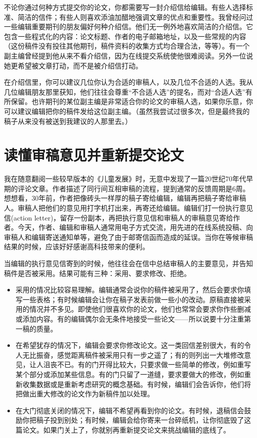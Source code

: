 不论你通过何种方式提交你的论文，你都需要写一封介绍信给编辑。有些人选择标准、简洁的信件；有些人则喜欢添油加醋地强调文章的优点和重要性。我曾经问过一些编辑重要期刊的朋友偏好何种介绍信。他们无一例外地喜欢简洁的介绍信。它包含一些程式化的内容：论文标题、作者的电子邮箱地址，以及一些常规的内容（这份稿件没有投往其他期刊，稿件资料的收集方式均合理合法，等等）。有一个副主编曾经提到他从来不看介绍信，因为在线提交系统使他很难阅读。另外一位说她更希望被文章打动，而不是被介绍信打动。

在介绍信里，你可以建议几位你认为合适的审稿人，以及几位不合适的人选。我从几位编辑朋友那里获知，他们往往会尊重“不合适人选”的提名，而对“合适人选”有所保留。也许期刊的某位副主编是非常适合你的论文的审稿人选，如果你乐意，你可以建议编辑把你的稿件发给这位副主编。（虽然我尝试过很多次，但是最终我的稿子从来没有被送到我建议的人那里去。）


\section{读懂审稿意见并重新提交论文}
我在随意翻阅一些较早版本的《儿童发展》时，无意中发现了一篇20世纪70年代早期的评论文章。作者描述了同行间互相审稿的流程，提到通常的反馈周期是6周。想想看，30年前，作者把像砖头一样厚的稿子寄给编辑，编辑再把稿子寄给审稿人。审稿人把他们的意见用打字机打出来，再寄还给编辑。编辑们打一份执行意见信(action letter)，留存一份副本，再把执行意见信和审稿人的审稿意见寄给作者。今天，作者、编辑和审稿人通常用电子方式交流，用先进的在线系统投稿、向审稿人和编辑寄送通知单等，避免了由于邮寄信函而造成的延误。当你在等候审稿结果的时候，应该好好感谢高科技带来的便利。

当编辑的执行意见信寄到的时候，他往往会在信中总结审稿人的主要意见，并告知稿件是否被采用。结果可能有三种：采用、要求修改、拒绝。

\begin{itemize}
\item 采用的情况比较容易理解。编辑通常会说你的稿件被采用了，然后会要求你填写一些表格；有时候编辑会让你在稿子发表前做一些小的改动。原稿直接被采用的情况并不多见。即使他们很喜欢你的论文，他们也常常会要求你作些删减或添加内容。有的编辑偶尔会无条件地接受一些论文——所以说要十分注重第一稿的质量。
\item 在希望犹存的情况下，编辑会要求你修改论文。这一类回信差别很大，有的令人无比振奋，感觉距离稿件被采用只有一步之遥了；有的则列出一大堆修改意见，让人沮丧不已。有的门开得比较大，只要求做一些简单的修改，例如重写某个部分或添加某些信息。有的门只留了一道缝，要求要做大的修改，例如重新收集数据或是重新考虑研究的概念基础。有时候，编辑们会告诉你，他们将把做出重大修改的论文作为新稿件加以处理。
\item 在大门彻底关闭的情况下，编辑不希望再看到你的论文。有时候，退稿信会鼓励你把稿子投到别处；有时候，编辑会给你寄来一台碎纸机，让你彻底毁了这篇论文。如果门关上了，你就别再重新提交论文来挑战编辑的底线了。
\end{itemize}

